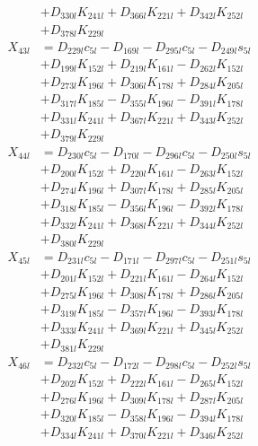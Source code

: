 \begin{multicols}{2}
\begin{align}
&+ D_{330l}K_{241l} + D_{366l}K_{221l} + D_{342l}K_{252l}  \nonumber \\
&+ D_{378l}K_{229l} \nonumber \\
X_{43l} &= D_{229l}c_{5l} - D_{169l} - D_{295l}c_{5l} - D_{249l}s_{5l}  \nonumber \\
&+ D_{199l}K_{152l} + D_{219l}K_{161l} - D_{262l}K_{152l}  \nonumber \\
&+ D_{273l}K_{196l} + D_{306l}K_{178l} + D_{284l}K_{205l}  \nonumber \\
&+ D_{317l}K_{185l} - D_{355l}K_{196l} - D_{391l}K_{178l}  \nonumber \\
&+ D_{331l}K_{241l} + D_{367l}K_{221l} + D_{343l}K_{252l}  \nonumber \\
&+ D_{379l}K_{229l} \nonumber \\
X_{44l} &= D_{230l}c_{5l} - D_{170l} - D_{296l}c_{5l} - D_{250l}s_{5l}  \nonumber \\
&+ D_{200l}K_{152l} + D_{220l}K_{161l} - D_{263l}K_{152l}  \nonumber \\
&+ D_{274l}K_{196l} + D_{307l}K_{178l} + D_{285l}K_{205l}  \nonumber \\
&+ D_{318l}K_{185l} - D_{356l}K_{196l} - D_{392l}K_{178l}  \nonumber \\
&+ D_{332l}K_{241l} + D_{368l}K_{221l} + D_{344l}K_{252l}  \nonumber \\
&+ D_{380l}K_{229l} \nonumber \\
X_{45l} &= D_{231l}c_{5l} - D_{171l} - D_{297l}c_{5l} - D_{251l}s_{5l}  \nonumber \\
&+ D_{201l}K_{152l} + D_{221l}K_{161l} - D_{264l}K_{152l}  \nonumber \\
&+ D_{275l}K_{196l} + D_{308l}K_{178l} + D_{286l}K_{205l}  \nonumber \\
&+ D_{319l}K_{185l} - D_{357l}K_{196l} - D_{393l}K_{178l}  \nonumber \\
&+ D_{333l}K_{241l} + D_{369l}K_{221l} + D_{345l}K_{252l}  \nonumber \\
&+ D_{381l}K_{229l} \nonumber \\
X_{46l} &= D_{232l}c_{5l} - D_{172l} - D_{298l}c_{5l} - D_{252l}s_{5l}  \nonumber \\
&+ D_{202l}K_{152l} + D_{222l}K_{161l} - D_{265l}K_{152l}  \nonumber \\
&+ D_{276l}K_{196l} + D_{309l}K_{178l} + D_{287l}K_{205l}  \nonumber \\
&+ D_{320l}K_{185l} - D_{358l}K_{196l} - D_{394l}K_{178l}  \nonumber \\
&+ D_{334l}K_{241l} + D_{370l}K_{221l} + D_{346l}K_{252l}  \nonumber \\

\end{align}
\end{multicols}
